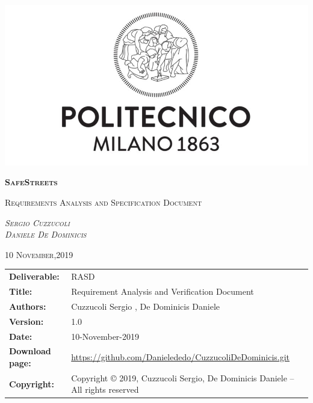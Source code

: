 




\begin{titlepage}
	\centering
	\includegraphics[width=\textwidth]{Images/PolimiLogo}\par\vspace{1cm}
	{\scshape\Huge\textbf{SafeStreets}\par}
	\vspace{1cm}
	{\scshape\Large Requirements Analysis and Specification Document\par}
	\vspace{2cm}
	{\scshape\Large\emph{Sergio Cuzzucoli}\\ \emph{Daniele De Dominicis}\par}
	\vspace{4cm}
	{\scshape\normalsize{10 November,2019}}
\end{titlepage}

\begin{table}[h!]
\begin{tabu} to \textwidth { X[0.3,r,p] X[0.7,l,p] }
\hline

\textbf{Deliverable:} & RASD\\
\textbf{Title:} & Requirement Analysis and Verification Document \\
\textbf{Authors:} & Cuzzucoli Sergio , De Dominicis Daniele \\
\textbf{Version:} & 1.0 \\ 
\textbf{Date:} & 10-November-2019  \\
\textbf{Download page:} & \href{https://github.com/Danielededo/CuzzucoliDeDominicis.git}{https://github.com/Danielededo/CuzzucoliDeDominicis.git} \\
\textbf{Copyright:} & Copyright © 2019, Cuzzucoli Sergio, De Dominicis Daniele – All rights reserved \\
\hline
\end{tabu}
\end{table}

